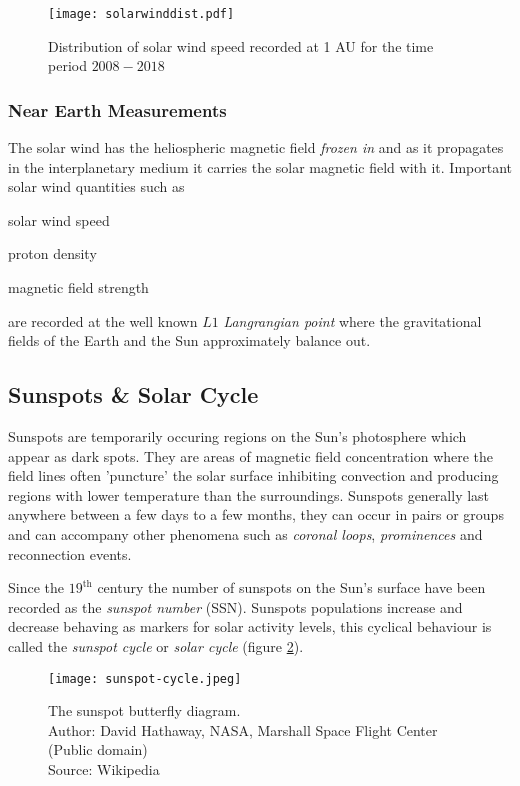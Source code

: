 \begin{figure}
    \noindent\centering\texttt{[image: solarwinddist.pdf]}
    \caption{
        {\small Distribution of solar wind speed recorded at 1 AU for the time period $2008 - 2018$}}
    \label{fig:solarwinddist}
\end{figure}

\subsubsection*{Near Earth Measurements}

The solar wind has the heliospheric magnetic field \emph{frozen in} and as it propagates in the interplanetary medium 
it carries the solar magnetic field with it. Important solar wind quantities such as 
\begin{enumerate*} \item solar wind speed \item proton density \item magnetic field strength \end{enumerate*} 
are recorded at the well known $L1$ \emph{Langrangian point} where the gravitational fields of the Earth and the Sun 
approximately balance out.



\subsection{Sunspots \& Solar Cycle}\label{sec:sunspots}

Sunspots are temporarily occuring regions on the Sun's photosphere which appear as dark spots. They are areas 
of magnetic field concentration where the field lines often 'puncture' the solar surface inhibiting convection 
and producing regions with lower temperature than the surroundings. Sunspots generally last anywhere between a 
few days to a few months, they can occur in pairs or groups and can accompany other phenomena such as 
\emph{coronal loops}, \emph{prominences} and reconnection events.

Since the $19^{\text{th}}$ century the number of sunspots on the Sun's surface have been recorded as the 
\emph{sunspot number} (SSN). Sunspots populations increase and decrease behaving as markers for solar activity levels, 
this cyclical behaviour is called the \emph{sunspot cycle} or \emph{solar cycle} (figure \ref{fig:SolarCycle}). 

\begin{figure}
    \noindent\texttt{[image: sunspot-cycle.jpeg]}
    \caption{{\small The sunspot butterfly diagram.  \\ 
    Author: David Hathaway, NASA, Marshall Space Flight Center (Public domain) \\ 
    Source: Wikipedia}}
    \label{fig:SolarCycle}
\end{figure}

